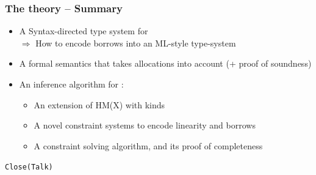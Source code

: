 \documentclass[aspectratio=169,dvipsnames,svgnames,10pt]{beamer}
\begin{document}
\begin{frame}
  \frametitle{The theory -- Summary}

  \begin{itemize}
  \item A Syntax-directed type system for \lang\\
    $\Rightarrow$ How to encode borrows into an ML-style type-system
  \item A formal semantics that takes allocations into account (+ proof of soundness)
  \item An inference algorithm for \lang:
    \begin{itemize}
    \item An extension of HM(X) with kinds
    \item A novel constraint systems to encode linearity and borrows
    \item A constraint solving algorithm, and its proof of completeness
    \end{itemize}
  \end{itemize}
\end{frame}

\begin{frame}[standout]

  \centering\Huge\texttt{Close(Talk)}
  
\end{frame}


\end{document}

